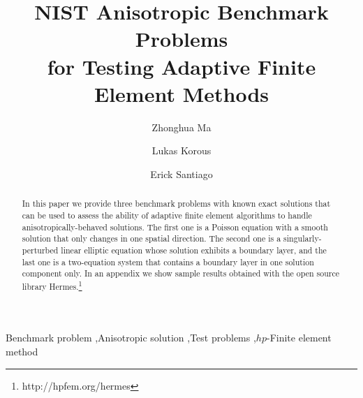 \documentclass[12pt]{elsarticle}
\begin{document}
\begin{frontmatter}



\title{NIST Anisotropic Benchmark Problems\\ for Testing Adaptive Finite Element Methods}

\author[label1]{Zhonghua Ma}
\author[label2]{Lukas Korous}
\author[label3]{Erick Santiago}
\address[label1]{China University of Petroleum, Beijing, China}
\address[label2]{Charles University, Prague, Czech Republic}
\address[label3]{University of Nevada, Reno, USA}

\begin{abstract}
In this paper we provide
three benchmark problems with known exact solutions that can be used to
assess the ability of adaptive finite element algorithms to handle
anisotropically-behaved solutions. The first one is
a Poisson equation with a smooth solution that only changes in one spatial direction.
The second one is a singularly-perturbed linear elliptic equation whose solution exhibits
a boundary layer, and the last one is a two-equation system that contains a boundary layer
in one solution component only. In an appendix we show sample results obtained with the
open source library {\sc Hermes}.\footnote{http://hpfem.org/hermes}

\end{abstract}

\begin{keyword}
Benchmark problem \sep Anisotropic solution \sep Test problems \sep $hp$-Finite element method
\end{keyword}

\end{frontmatter}
\end{document}
